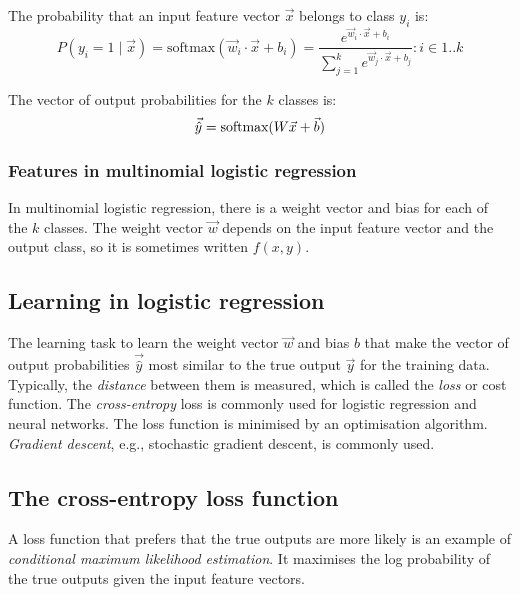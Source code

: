 The probability that an input feature vector $\vec{x}$ belongs to class $y_i$ is:
\begin{equation}
  \label{eqnSoftmax1}
  P(y_i = 1 \mid \vec{x})
  = \text{softmax}(\vec{w}_i \cdot \vec{x} + b_i)
  = \frac{e^{\vec{w}_i \cdot \vec{x} + b_i}}{\sum_{j = 1}^{k} e^{\vec{w}_j \cdot \vec{x} + b_j}}
  : i \in 1 .. k
\end{equation}

The vector of output probabilities for the $k$ classes is:
\begin{equation}
  \label{eqnSoftmax2}
  \vec{\hat{y}} = \text{softmax}(W \vec{x} + \vec{b})
\end{equation}

\subsubsection{Features in multinomial logistic regression}

In multinomial logistic regression, there is a weight vector and bias for each of the $k$ classes.
The weight vector $\vec{w}$ depends on the input feature vector and the output class, so it is sometimes written $f(x, y)$.

\subsection{Learning in logistic regression}

The learning task to learn the weight vector $\vec{w}$ and bias $b$ that make the vector of output probabilities $\vec{\hat{y}}$ most similar to the true output $\vec{y}$ for the training data.
Typically, the \textit{distance} between them is measured, which is called the \textit{loss} or cost function.
The \textit{cross-entropy} loss is commonly used for logistic regression and neural networks.
The loss function is minimised by an optimisation algorithm.
\textit{Gradient descent}, e.g., stochastic gradient descent, is commonly used.

\subsection{The cross-entropy loss function}

A loss function that prefers that the true outputs are more likely is an example of \textit{conditional maximum likelihood estimation}.
It maximises the log probability of the true outputs given the input feature vectors.

